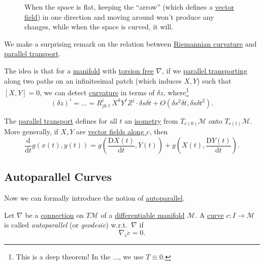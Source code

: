\begin{figure}[H]
	\centering
	\caption{When the space is flat, keeping the ``arrow'' (which defines a \hyperref[def:vector-field]{vector field}) in one direction and moving around won't produce any changes, while when the space is curved, it will.}
	\label{fig:parallel-transport}
\end{figure}

We make a surprising remark on the relation between \hyperref[def:Riemannian-curvature]{Riemannian curvature} and \hyperref[def:parallel-transport]{parallel transport}.

\begin{remark}
	The idea is that for a \hyperref[def:smooth-manifold]{manifold} with \hyperref[def:torsion-free]{torsion free} \(\nabla \), if we \hyperref[def:parallel-transport]{parallel transporting} along two paths on an infinitesimal patch (which induces \(X, Y\)) such that \([X, Y]=0\), we can detect \hyperref[def:Riemannian-curvature]{curvature} in terms of \(\delta z\), where\footnote{This is a deep theorem! In the \(\ldots \), we use \(T \equiv 0\).}
	\[
		(\delta z)^i = \ldots = R^i_{jk \ell } X^k Y^{\ell} Z^j\cdot \delta s \delta t + O(\delta s^2 \delta t, \delta s \delta t^2).
	\]
	\begin{center}
	\end{center}
\end{remark}

\begin{proposition}
	The \hyperref[def:parallel-transport]{parallel transport} defines for all \(t\) an \hyperref[def:isometry]{isometry} from \(T_{c(0)} \mathcal{M} \) onto \(T_{c(t)} \mathcal{M} \). More generally, if \(X, Y\) are \hyperref[def:vector-field-along-curve]{vector fields along \(c\)}, then
	\[
		\frac{\mathrm{d}}{\mathrm{d}t} g(x(t), y(t))
		= g\left( \frac{\mathrm{D} X(t)}{\mathrm{d} t}, Y(t)\right) + g\left(X(t), \frac{\mathrm{D} Y(t)}{\mathrm{d} t} \right) .
	\]
\end{proposition}

\subsection{Autoparallel Curves}
Now we can formally introduce the notion of \hyperref[def:autoparallel]{autoparallel}.

\begin{definition}[Autoparallel]\label{def:autoparallel}
	Let \(\nabla \) be a \hyperref[def:linear-connection]{connection} on \(T \mathcal{M} \) of a \hyperref[def:smooth-manifold]{differentiable manifold} \(\mathcal{M} \). A \hyperref[def:curve]{curve} \(c\colon I \to \mathcal{M} \) is called \emph{autoparallel} (or \emph{geodesic}) w.r.t.\ \(\nabla \) if
	\[
		\nabla _{\dot{c}}\dot{c} = 0.
	\]
\end{definition}

